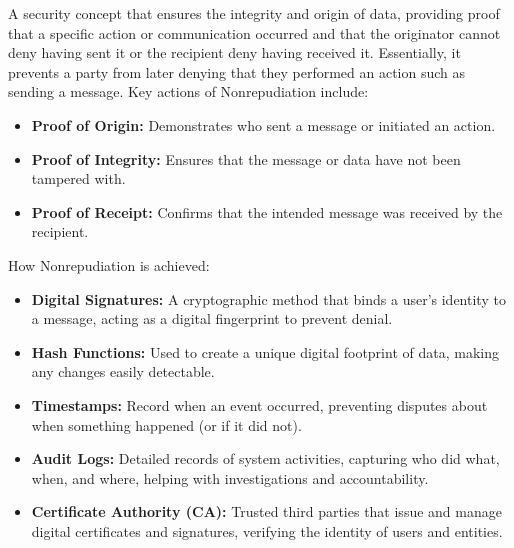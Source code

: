  A security concept that ensures the integrity and origin of data, providing proof that a specific action or communication occurred and that the originator cannot deny having sent it or the recipient deny having received it. Essentially, it prevents a party from later denying that they performed an action such as sending a message. Key actions of Nonrepudiation include:
\begin{itemize}
    \item \textbf{Proof of Origin:} Demonstrates who sent a message or initiated an action.
    \item \textbf{Proof of Integrity:} Ensures that the message or data have not been tampered with.
    \item \textbf{Proof of Receipt:} Confirms that the intended message was received by the recipient.
\end{itemize}
How Nonrepudiation is achieved:
\begin{itemize}
    \item \textbf{Digital Signatures:} A cryptographic method that binds a user's identity to a message, acting as a digital fingerprint to prevent denial.
    \item \textbf{Hash Functions:} Used to create a unique digital footprint of data, making any changes easily detectable.
    \item \textbf{Timestamps:} Record when an event occurred, preventing disputes about when something happened (or if it did not).
    \item \textbf{Audit Logs:} Detailed records of system activities, capturing who did what, when, and where, helping with investigations and accountability.
    \item \textbf{Certificate Authority (CA):} Trusted third parties that issue and manage digital certificates and signatures, verifying the identity of users and entities.
    \end{itemize}

